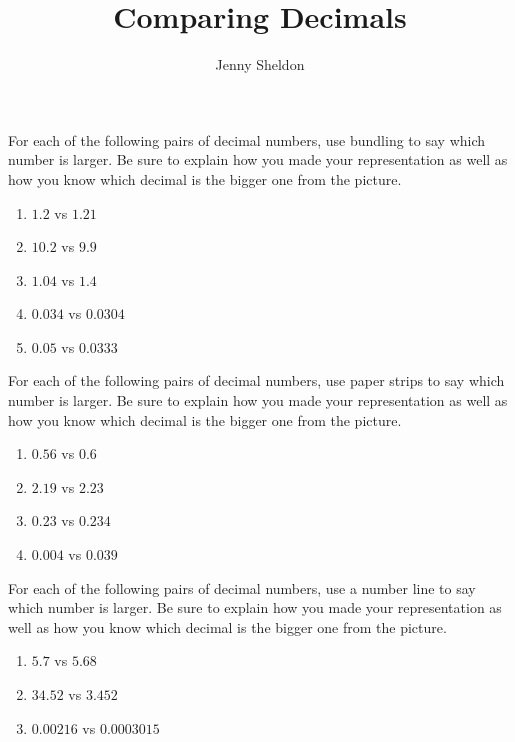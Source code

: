 \documentclass{ximera}
\title{Comparing Decimals}
\author{Jenny Sheldon}
\begin{document}
\begin{abstract} \end{abstract}
\maketitle



\begin{problem}
For each of the following pairs of decimal numbers, use bundling to say which number is larger. Be sure to explain how you made your representation as well as how you know which decimal is the bigger one from the picture.
\begin{enumerate}
\item $1.2$ vs $1.21$
\item $10.2$ vs $9.9$
\item $1.04$ vs $1.4$
\item $0.034$ vs $0.0304$
\item $0.05$ vs $0.0333$
\end{enumerate}

\end{problem}

\begin{problem}
For each of the following pairs of decimal numbers, use paper strips to say which number is larger. Be sure to explain how you made your representation as well as how you know which decimal is the bigger one from the picture.
\begin{enumerate}
\item $0.56$ vs $0.6$
\item $2.19$ vs $2.23$
\item $0.23$ vs $0.234$
\item $0.004$ vs $0.039$
\end{enumerate}

\end{problem}

\begin{problem}
For each of the following pairs of decimal numbers, use a number line to say which number is larger. Be sure to explain how you made your representation as well as how you know which decimal is the bigger one from the picture.
\begin{enumerate}
\item $5.7$ vs $5.68$
\item $34.52$ vs $3.452$
\item $0.00216$ vs $0.0003015$
\end{enumerate}

\end{problem}
\end{document}
